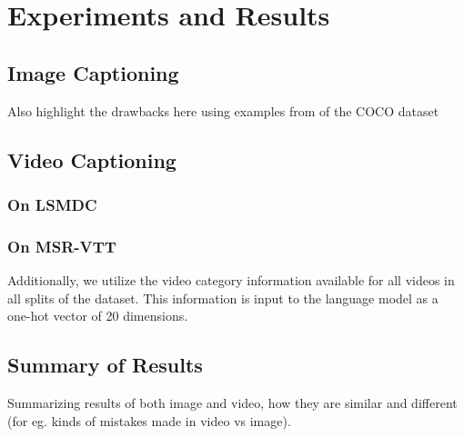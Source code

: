 \chapter{Experiments and Results}
\label{chapter:results}

\section{Image Captioning}
Also highlight the drawbacks here using examples from of the COCO dataset

\section{Video Captioning}
\subsection{On LSMDC}
\subsection{On MSR-VTT}
Additionally, we utilize the video category information available for all videos
in all splits of the dataset.
This information is input to the language model as a one-hot vector of 20
dimensions.
\section{Summary of Results}
Summarizing results of both image and video, how they are similar and different
(for eg. kinds of mistakes made in video vs image).
